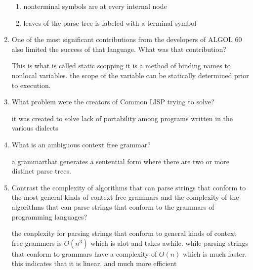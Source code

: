 \begin{enumerate}
  \begin{answer}

  \begin{enumerate}
    \item nonterminal symbols are at every internal node
    \item leaves of the parse tree is labeled with a terminal symbol
    \end{enumerate}

    \end{answer}


  \item One of the most significant contributions from the developers
    of ALGOL 60 also limited the success of that language. What was
    that contribution?

  \begin{answer}

   This is what is called static scopping it is a method of binding
   names to nonlocal variables. the scope of the variable can be
   statically determined prior to execution.
    \end{answer}

  \item What problem were the creators of Common LISP trying to solve?

  \begin{answer}

  it was created to solve lack of portability among programs written
  in the various dialects

    \end{answer}

  \item What is an ambiguous context free grammar?

  \begin{answer}
    a grammarthat generates a sentential form where there are two or
    more distinct parse trees.
        \end{answer}

  \item Contrast the complexity of algorithms that can parse strings
    that conform to the most general kinds of context free grammars
    and the complexity of the algorithms that can parse strings that
    conform to the grammars of programming languages?

  \begin{answer}

    the conplexity for parsing strings that conform to general kinds
    of context free grammers is $O(n^3)$ which is alot and takes
    awhile. while parsing strings that conform to grammars have a
    complexity of $O(n)$ which is much faster. this indicates that it is
    linear. and much more efficient


\end{answer}
\end{enumerate}

